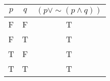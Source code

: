 \begin{tabular}{|c|c||c|}
\hline
$ p $ & $ q $ & $ (p \vee  \sim (p \wedge q)) $ \\
\hline
F & F & T \\
F & T & T \\
T & F & T \\
T & T & T \\
\hline
\end{tabular}
\label{table:tt1}
